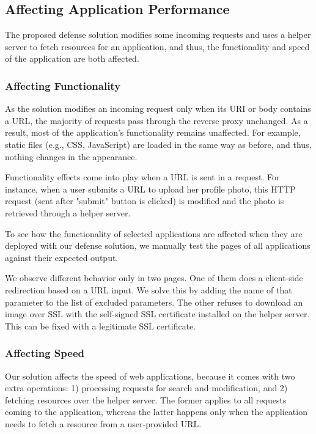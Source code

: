 \subsection{Affecting Application Performance}
The proposed defense solution modifies some incoming requests and uses a helper server to fetch resources for an application, and thus, the functionality and speed of the application are both affected.

\subsubsection{Affecting Functionality}
As the solution modifies an incoming request only when its URI or body contains a URL, the majority of requests pass through the reverse proxy unchanged. As a result, most of the application's functionality remains unaffected. For example, static files (e.g., CSS, JavaScript) are loaded in the same way as before, and thus, nothing changes in the appearance. 

Functionality effects come into play when a URL is sent in a request. For instance, when a user submits a URL to upload her profile photo, this HTTP request (sent after "submit" button is clicked) is modified and the photo is retrieved through a helper server.

To see how the functionality of selected applications are affected when they are deployed with our defense solution, we manually test the pages of all applications against their expected output. 

We observe different behavior only in two pages. One of them does a client-side redirection based on a URL input. We solve this by adding the name of that parameter to the list of excluded parameters. The other refuses to download an image over SSL with the self-signed SSL certificate installed on the helper server. This can be fixed with a legitimate SSL certificate. %


\subsubsection{Affecting Speed}
Our solution affects the speed of web applications, because it comes with two extra operations: 1) processing requests for search and modification, and 2) fetching resources over the helper server. The former applies to all requests coming to the application, whereas the latter happens only when the application needs to fetch a resource from a user-provided URL.

